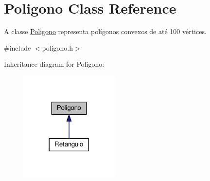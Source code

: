 \hypertarget{class_poligono}{}\section{Poligono Class Reference}
\label{class_poligono}


A classe \hyperlink{class_poligono}{Poligono} representa polígonos convexos de até 100 vértices.  




{\ttfamily \#include $<$poligono.\+h$>$}



Inheritance diagram for Poligono\+:
\nopagebreak
\begin{figure}[H]
\begin{center}
\leavevmode
\includegraphics[width=141pt]{class_poligono__inherit__graph}
\end{center}
\end{figure}
